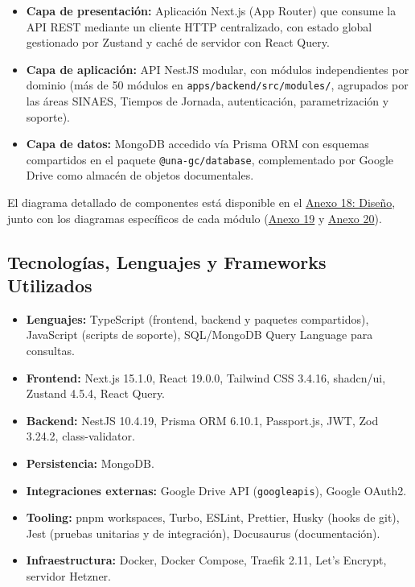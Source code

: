 \begin{itemize}
    \item \textbf{Capa de presentación:} Aplicación Next.js (App Router) que consume la API REST mediante un cliente HTTP centralizado, con estado global gestionado por Zustand y caché de servidor con React Query.
    \item \textbf{Capa de aplicación:} API NestJS modular, con módulos independientes por dominio (más de 50 módulos en \texttt{apps/backend/src/modules/}, agrupados por las áreas SINAES, Tiempos de Jornada, autenticación, parametrización y soporte).
    \item \textbf{Capa de datos:} MongoDB accedido vía Prisma ORM con esquemas compartidos en el paquete \texttt{@una-gc/database}, complementado por Google Drive como almacén de objetos documentales.
\end{itemize}

El diagrama detallado de componentes está disponible en el \hyperref[anexo:diseno]{Anexo 18: Diseño}, junto con los diagramas específicos de cada módulo (\hyperref[anexo:anexo19]{Anexo 19} y \hyperref[anexo:anexo20]{Anexo 20}).

\subsection{Tecnologías, Lenguajes y Frameworks Utilizados}

\begin{itemize}
    \item \textbf{Lenguajes:} TypeScript (frontend, backend y paquetes compartidos), JavaScript (scripts de soporte), SQL/MongoDB Query Language para consultas.
    \item \textbf{Frontend:} Next.js 15.1.0, React 19.0.0, Tailwind CSS 3.4.16, shadcn/ui, Zustand 4.5.4, React Query.
    \item \textbf{Backend:} NestJS 10.4.19, Prisma ORM 6.10.1, Passport.js, JWT, Zod 3.24.2, class-validator.
    \item \textbf{Persistencia:} MongoDB.
    \item \textbf{Integraciones externas:} Google Drive API (\texttt{googleapis}), Google OAuth2.
    \item \textbf{Tooling:} pnpm workspaces, Turbo, ESLint, Prettier, Husky (hooks de git), Jest (pruebas unitarias y de integración), Docusaurus (documentación).
    \item \textbf{Infraestructura:} Docker, Docker Compose, Traefik 2.11, Let's Encrypt, servidor Hetzner.
\end{itemize}

